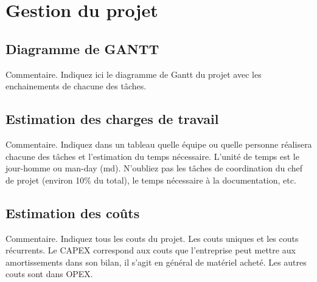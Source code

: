\section{Gestion du projet}

\subsection{Diagramme de GANTT}
Commentaire.  Indiquez ici le diagramme de Gantt du projet avec les enchainements de chacune des tâches.

\subsection{Estimation des charges de travail}
Commentaire.  Indiquez dans un tableau quelle équipe ou quelle personne réalisera chacune des tâches et l’estimation du temps nécessaire.  L’unité de temps est le jour-homme ou man-day (md).  N’oubliez pas les tâches de coordination du chef de projet (environ 10\% du total), le temps nécessaire à la documentation, etc.

\subsection{Estimation des coûts}
Commentaire.  Indiquez tous les couts du projet.  Les couts uniques et les couts récurrents.  Le CAPEX correspond aux couts que l’entreprise peut mettre aux amortissements dans son bilan, il s’agit en général de matériel acheté.  Les autres couts sont dans OPEX.
